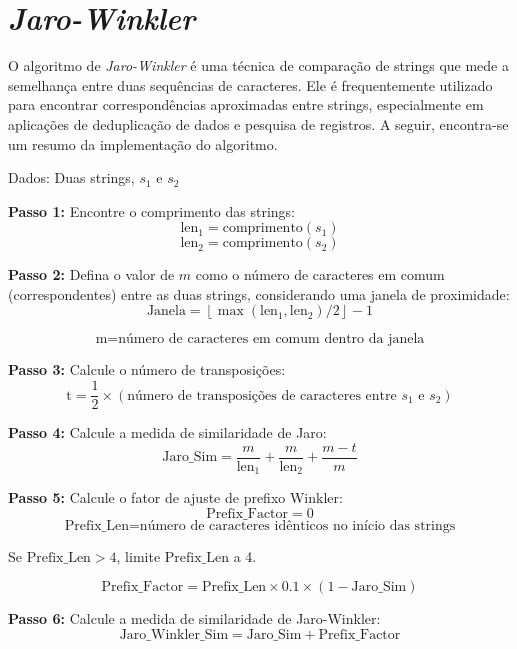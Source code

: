 \documentclass[
	12pt,			%
	openright,		%
	oneside,	
	a4paper,		%
	english,		%
	brazil			%
]{abntex2/abntex2}  %
\begin{document}
		\section{\textit{Jaro-Winkler}} \label{jaro-winkler}
		
			O algoritmo de \textit{Jaro-Winkler} \cite{jaro-winkler} é uma técnica de comparação de strings que mede a semelhança entre duas sequências de caracteres. Ele é frequentemente utilizado para encontrar correspondências aproximadas entre strings, especialmente em aplicações de deduplicação de dados e pesquisa de registros. A seguir, encontra-se um resumo da implementação do algoritmo.
			
			Dados: Duas strings, $s_1$ e $s_2$
			
			\noindent
			\textbf{Passo 1:} Encontre o comprimento das strings:
			\[
			\text{len}_1 = \text{comprimento}(s_1)
			\]
			\[
			\text{len}_2 = \text{comprimento}(s_2)
			\]
			
			\noindent
			\textbf{Passo 2:} Defina o valor de $m$ como o número de caracteres em comum (correspondentes) entre as duas strings, considerando uma janela de proximidade:
			\[
			\text{Janela} = \left\lfloor\max(\text{len}_1, \text{len}_2) / 2\right\rfloor - 1
			\]
			
			\[
			\text{m} = \text{número de caracteres em comum dentro da janela}
			\]
			
			\noindent
			\textbf{Passo 3:} Calcule o número de transposições:
			\[
			\text{t} = \frac{1}{2} \times \left(\text{número de transposições de caracteres entre $s_1$ e $s_2$}\right)
			\]
			
			\noindent
			\textbf{Passo 4:} Calcule a medida de similaridade de Jaro:
			\[
			\text{Jaro\_Sim} = \frac{m}{\text{len}_1} + \frac{m}{\text{len}_2} + \frac{m - t}{m}
			\]
			
			\noindent
			\textbf{Passo 5:} Calcule o fator de ajuste de prefixo Winkler:
			\[
			\text{Prefix\_Factor} = 0
			\]
			\[
			\text{Prefix\_Len} = \text{número de caracteres idênticos no início das strings}
			\]
			
			Se $\text{Prefix\_Len} > 4$, limite $\text{Prefix\_Len}$ a 4.
			
			\[
			\text{Prefix\_Factor} = \text{Prefix\_Len} \times 0.1 \times (1 - \text{Jaro\_Sim})
			\]
			
			\noindent
			\textbf{Passo 6:} Calcule a medida de similaridade de Jaro-Winkler:
			\[
			\text{Jaro\_Winkler\_Sim} = \text{Jaro\_Sim} + \text{Prefix\_Factor}
			\]
			
\end{document}
